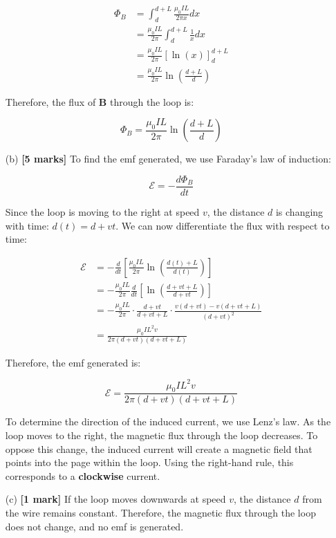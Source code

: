 \documentclass{article}
\begin{document}
\begin{enumerate}
\begin{align*}
\Phi_B &= \int_{d}^{d+L} \frac{\mu_0 I L}{2 \pi x} dx \\
&= \frac{\mu_0 I L}{2 \pi} \int_{d}^{d+L} \frac{1}{x} dx \\
&= \frac{\mu_0 I L}{2 \pi} \left[ \ln(x) \right]_{d}^{d+L} \\
&= \frac{\mu_0 I L}{2 \pi} \ln \left( \frac{d+L}{d} \right)
\end{align*}

Therefore, the flux of $\mathbf{B}$ through the loop is:

\begin{equation*}
\boxed{\Phi_B = \frac{\mu_0 I L}{2 \pi} \ln \left( \frac{d+L}{d} \right)}
\end{equation*}


\item[(b)] \textbf{[5 marks]} 
To find the emf generated, we use Faraday's law of induction:

\begin{equation*}
\mathcal{E} = -\frac{d\Phi_B}{dt}
\end{equation*}

Since the loop is moving to the right at speed $v$, the distance $d$ is changing with time: $d(t) = d + vt$.  We can now differentiate the flux with respect to time:

\begin{align*}
\mathcal{E} &= -\frac{d}{dt} \left[ \frac{\mu_0 I L}{2 \pi} \ln \left( \frac{d(t)+L}{d(t)} \right) \right] \\
&= -\frac{\mu_0 I L}{2 \pi} \frac{d}{dt} \left[ \ln \left( \frac{d + vt + L}{d + vt} \right) \right] \\
&= -\frac{\mu_0 I L}{2 \pi} \cdot \frac{d + vt}{d + vt + L} \cdot \frac{v(d+vt) - v(d+vt+L)}{(d+vt)^2} \\
&= \frac{\mu_0 I L^2 v}{2 \pi (d+vt)(d+vt+L)}
\end{align*}

Therefore, the emf generated is:

\begin{equation*}
\boxed{\mathcal{E} = \frac{\mu_0 I L^2 v}{2 \pi (d+vt)(d+vt+L)}}
\end{equation*}

To determine the direction of the induced current, we use Lenz's law. As the loop moves to the right, the magnetic flux through the loop decreases. To oppose this change, the induced current will create a magnetic field that points into the page within the loop. Using the right-hand rule, this corresponds to a \textbf{clockwise} current.


\item[(c)] \textbf{[1 mark]} 
If the loop moves downwards at speed $v$, the distance $d$ from the wire remains constant. Therefore, the magnetic flux through the loop does not change, and no emf is generated. 
\end{enumerate}
\end{document}
